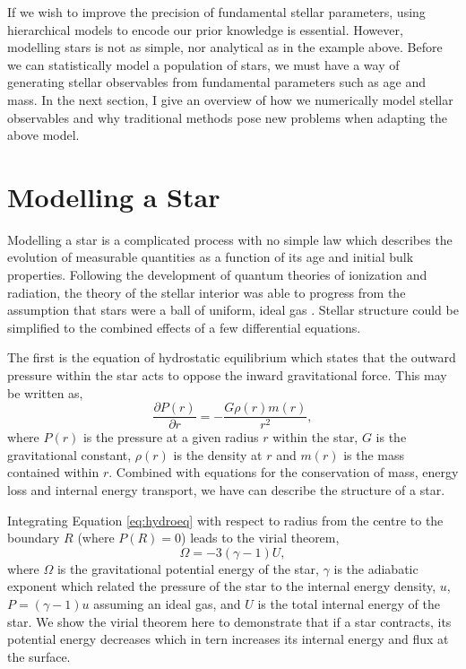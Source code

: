 If we wish to improve the precision of fundamental stellar parameters, using hierarchical models to encode our prior knowledge is essential. However, modelling stars is not as simple, nor analytical as in the example above. Before we can statistically model a population of stars, we must have a way of generating stellar observables from fundamental parameters such as age and mass. In the next section, I give an overview of how we numerically model stellar observables and why traditional methods pose new problems when adapting the above model.

\section{Modelling a Star}

Modelling a star is a complicated process with no simple law which describes the evolution of measurable quantities as a function of its age and initial bulk properties. Following the development of quantum theories of ionization and radiation, the theory of the stellar interior was able to progress from the assumption that stars were a ball of uniform, ideal gas \citet{Eddington1926}. Stellar structure could be simplified to the combined effects of a few differential equations.

The first is the equation of hydrostatic equilibrium which states that the outward pressure within the star acts to oppose the inward gravitational force. This may be written as,
\begin{equation}
    \frac{\partial P(r)}{\partial r}=-\frac{G \rho(r) m(r)}{r^{2}},\label{eq:hydroeq}
\end{equation}
where $P(r)$ is the pressure at a given radius $r$ within the star, $G$ is the gravitational constant, $\rho(r)$ is the density at $r$ and $m(r)$ is the mass contained within $r$. Combined with equations for the conservation of mass, energy loss and internal energy transport, we have can describe the structure of a star.

Integrating Equation \ref{eq:hydroeq} with respect to radius from the centre to the boundary $R$ (where $P(R)=0$) leads to the virial theorem,
\begin{equation}
    \Omega = - 3(\gamma - 1) U,
\end{equation}
where $\Omega$ is the gravitational potential energy of the star, $\gamma$ is the adiabatic exponent which related the pressure of the star to the internal energy density, $u$, $P = (\gamma - 1) u$ assuming an ideal gas, and $U$ is the total internal energy of the star. We show the virial theorem here to demonstrate that if a star contracts, its potential energy decreases which in tern increases its internal energy and flux at the surface.

